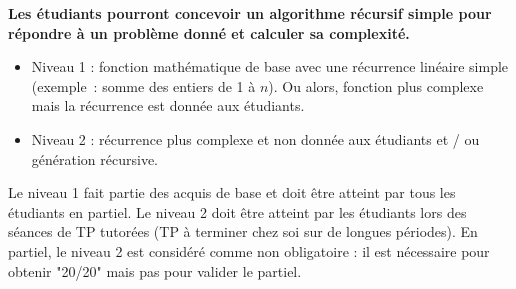\documentclass{../cours}
\begin{document}
\begin{aav}
\textbf{Les étudiants pourront concevoir un algorithme récursif simple pour répondre à un problème donné et calculer sa complexité.}
\begin{itemize}
\item Niveau 1 : fonction mathématique de base avec une récurrence linéaire simple (exemple~: somme des entiers de 1 à $n$). Ou alors, fonction plus complexe mais la récurrence est donnée aux étudiants.
\item Niveau 2 : récurrence plus complexe et non donnée aux étudiants et / ou génération récursive.
\end{itemize}

Le niveau 1 fait partie des acquis de base et doit être atteint par tous les étudiants en partiel. Le niveau 2 doit être atteint par les étudiants lors des séances de TP tutorées (TP à terminer chez soi sur de longues périodes). En partiel, le niveau 2 est considéré comme non obligatoire : il est nécessaire pour obtenir "20/20" mais pas pour valider le partiel.
\end{aav}
\end{document}
